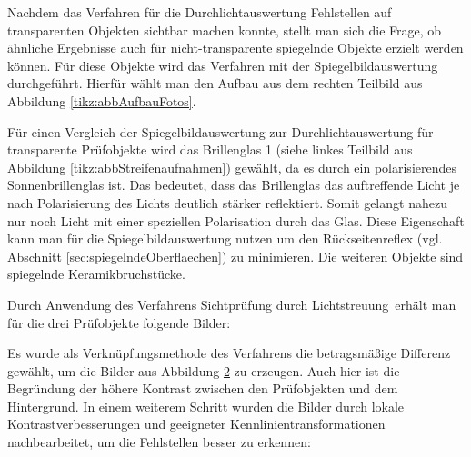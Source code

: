 Nachdem das Verfahren für die Durchlichtauswertung Fehlstellen auf transparenten Objekten sichtbar machen konnte, stellt man sich die Frage, ob ähnliche Ergebnisse auch für nicht-transparente spiegelnde Objekte erzielt werden können.
Für diese Objekte wird das Verfahren mit der Spiegelbildauswertung durchgeführt.
Hierfür wählt man den Aufbau aus dem rechten Teilbild aus Abbildung \ref{tikz:abbAufbauFotos}.

\p
Für einen Vergleich der Spiegelbildauswertung zur Durchlichtauswertung für transparente Prüfobjekte wird das Brillenglas 1 (siehe linkes Teilbild aus Abbildung \ref{tikz:abbStreifenaufnahmen}) gewählt, da es durch ein polarisierendes Sonnenbrillenglas ist.
Das bedeutet, dass das Brillenglas das auftreffende Licht je nach Polarisierung des Lichts deutlich stärker reflektiert.
Somit gelangt nahezu nur noch Licht mit einer speziellen Polarisation durch das Glas.
Diese Eigenschaft kann man für die Spiegelbildauswertung nutzen um den Rückseitenreflex (vgl. Abschnitt \ref{sec:spiegelndeOberflaechen}) zu minimieren.
Die weiteren Objekte sind spiegelnde Keramikbruchstücke.

{
	\begin{figure}[H]
		\centering
		
		\label{tikz:abbStreifenaufnahmenSpLichtstreuung}
	\end{figure}
}

\noindent
Durch Anwendung des Verfahrens \glqq Sichtprüfung durch Lichtstreuung\grqq ~erhält man für die drei Prüfobjekte folgende Bilder:

{
	\begin{figure}[H]
		\centering
		
		\label{tikz:abbCombinePatternPicturesSpLichtstreuung}
	\end{figure}
}

\noindent
Es wurde als Verknüpfungsmethode des Verfahrens die betragsmäßige Differenz gewählt, um die Bilder aus Abbildung \ref{tikz:abbCombinePatternPicturesSpLichtstreuung} zu erzeugen.
Auch hier ist die Begründung der höhere Kontrast zwischen den Prüfobjekten und dem Hintergrund.
In einem weiterem Schritt wurden die Bilder durch lokale Kontrastverbesserungen und geeigneter Kennlinientransformationen nachbearbeitet, um die Fehlstellen besser zu erkennen:

